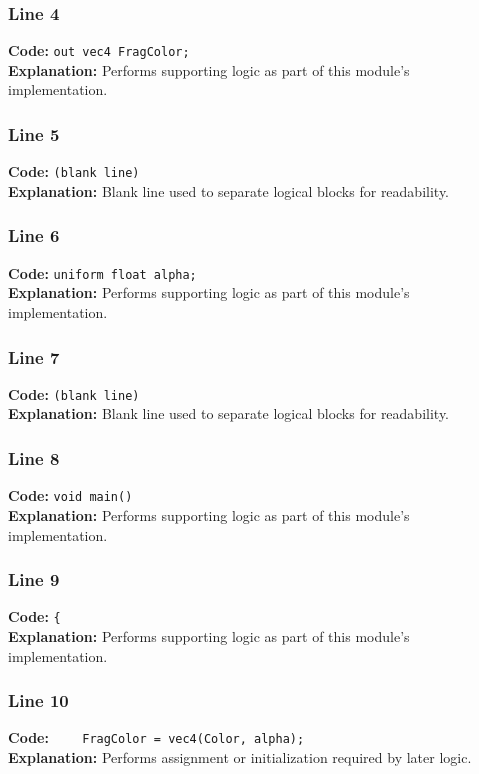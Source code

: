 \documentclass[11pt,a4paper]{article}
\begin{document}
\subsubsection*{Line 4}
\textbf{Code:} \verb|out vec4 FragColor;|\\
\textbf{Explanation:} Performs supporting logic as part of this module's implementation.

\subsubsection*{Line 5}
\textbf{Code:} \texttt{(blank line)}\\
\textbf{Explanation:} Blank line used to separate logical blocks for readability.

\subsubsection*{Line 6}
\textbf{Code:} \verb|uniform float alpha;|\\
\textbf{Explanation:} Performs supporting logic as part of this module's implementation.

\subsubsection*{Line 7}
\textbf{Code:} \texttt{(blank line)}\\
\textbf{Explanation:} Blank line used to separate logical blocks for readability.

\subsubsection*{Line 8}
\textbf{Code:} \verb|void main()|\\
\textbf{Explanation:} Performs supporting logic as part of this module's implementation.

\subsubsection*{Line 9}
\textbf{Code:} \verb|{|\\
\textbf{Explanation:} Performs supporting logic as part of this module's implementation.

\subsubsection*{Line 10}
\textbf{Code:} \verb|    FragColor = vec4(Color, alpha);|\\
\textbf{Explanation:} Performs assignment or initialization required by later logic.
\end{document}
